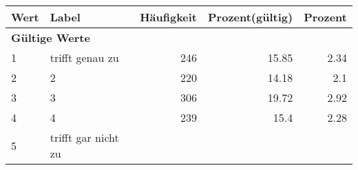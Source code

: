      \begin{longtable}{lXrrr}
     \toprule
     \textbf{Wert} & \textbf{Label} & \textbf{Häufigkeit} & \textbf{Prozent(gültig)} & \textbf{Prozent} \\
     \endhead
     \midrule
     \multicolumn{5}{l}{\textbf{Gültige Werte}}\\

     1 &
     \multicolumn{1}{X}{ trifft genau zu   } &


       \num{246} &
       \num[round-mode=places,round-precision=2]{15.85} &
         \num[round-mode=places,round-precision=2]{2.34} \\

     2 &
     \multicolumn{1}{X}{ 2   } &


       \num{220} &
       \num[round-mode=places,round-precision=2]{14.18} &
         \num[round-mode=places,round-precision=2]{2.1} \\

     3 &
     \multicolumn{1}{X}{ 3   } &


       \num{306} &
       \num[round-mode=places,round-precision=2]{19.72} &
         \num[round-mode=places,round-precision=2]{2.92} \\

     4 &
     \multicolumn{1}{X}{ 4   } &


       \num{239} &
       \num[round-mode=places,round-precision=2]{15.4} &
         \num[round-mode=places,round-precision=2]{2.28} \\

     5 &
     \multicolumn{1}{X}{ trifft gar nicht zu   } &



\end{longtable}
